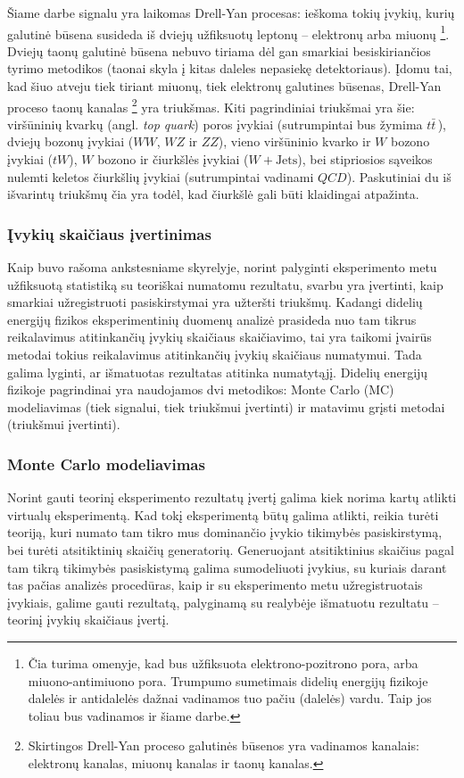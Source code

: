 \documentclass[a4paper, 12pt]{article}
\newcommand{\WJets}{W\! +\!\mathrm{Jets}}
\newcommand{\QCD}{QC\! D}
\newlength\q
\begin{document}
Šiame darbe signalu yra laikomas Drell-Yan procesas: ieškoma tokių įvykių, kurių galutinė būsena
susideda iš dviejų užfiksuotų leptonų -- elektronų arba miuonų
	\footnote{Čia turima omenyje, kad bus užfiksuota elektrono-pozitrono pora,
	arba miuono-antimiuono pora.
	Trumpumo sumetimais didelių energijų fizikoje dalelės ir antidalelės dažnai vadinamos tuo
	pačiu (dalelės) vardu.
	Taip jos toliau bus vadinamos ir šiame darbe.}. 
Dviejų taonų galutinė būsena nebuvo tiriama dėl gan smarkiai besiskiriančios tyrimo metodikos
(taonai skyla į kitas daleles nepasiekę detektoriaus). Įdomu tai, kad šiuo atveju tiek tiriant
miuonų, tiek elektronų galutines būsenas, Drell-Yan proceso taonų kanalas
	\footnote{Skirtingos Drell-Yan proceso galutinės būsenos yra vadinamos kanalais:
	elektronų kanalas, miuonų kanalas ir taonų kanalas.}
yra triukšmas. Kiti pagrindiniai triukšmai yra šie: viršūninių kvarkų (angl. \textit{top quark})
poros įvykiai (sutrumpintai bus žymima $t\bar{t}\,$), dviejų bozonų įvykiai ($WW$, $WZ$ ir $ZZ$),
vieno viršūninio kvarko ir $W$ bozono įvykiai ($tW$), $W$ bozono ir čiurkšlės įvykiai ($\WJets$),
bei stipriosios sąveikos nulemti keletos čiurkšlių įvykiai (sutrumpintai vadinami $\QCD$).
Paskutiniai du iš išvarintų triukšmų čia yra todėl, kad čiurkšlė gali būti klaidingai atpažinta.

\subsubsection{Įvykių skaičiaus įvertinimas}

Kaip buvo rašoma ankstesniame skyrelyje, norint palyginti eksperimento metu užfiksuotą
statistiką su teoriškai numatomu rezultatu, svarbu yra įvertinti, kaip smarkiai užregistruoti
pasiskirstymai yra užteršti triukšmų.
Kadangi didelių energijų fizikos eksperimentinių duomenų analizė prasideda nuo tam tikrus
reikalavimus atitinkančių įvykių skaičiaus skaičiavimo, tai yra taikomi įvairūs metodai
tokius reikalavimus atitinkančių įvykių skaičiaus numatymui.
Tada galima lyginti, ar išmatuotas rezultatas atitinka numatytąjį.
Didelių energijų fizikoje pagrindinai yra naudojamos dvi metodikos: Monte Carlo (MC) modeliavimas
(tiek signalui, tiek triukšmui įvertinti) ir matavimu grįsti metodai (triukšmui įvertinti).

\subsubsection*{Monte Carlo modeliavimas}

Norint gauti teorinį eksperimento rezultatų įvertį galima kiek norima kartų atlikti virtualų
eksperimentą.
Kad tokį eksperimentą būtų galima atlikti, reikia turėti teoriją, kuri numato tam tikro mus
dominančio įvykio tikimybės pasiskirstymą, bei turėti atsitiktinių skaičių generatorių.
Generuojant atsitiktinius skaičius pagal tam tikrą tikimybės pasiskistymą galima sumodeliuoti
įvykius, su kuriais darant tas pačias analizės procedūras, kaip ir su eksperimento metu
užregistruotais įvykiais, galime gauti rezultatą, palyginamą su realybėje išmatuotu
rezultatu -- teorinį įvykių skaičiaus įvertį.
\end{document}
